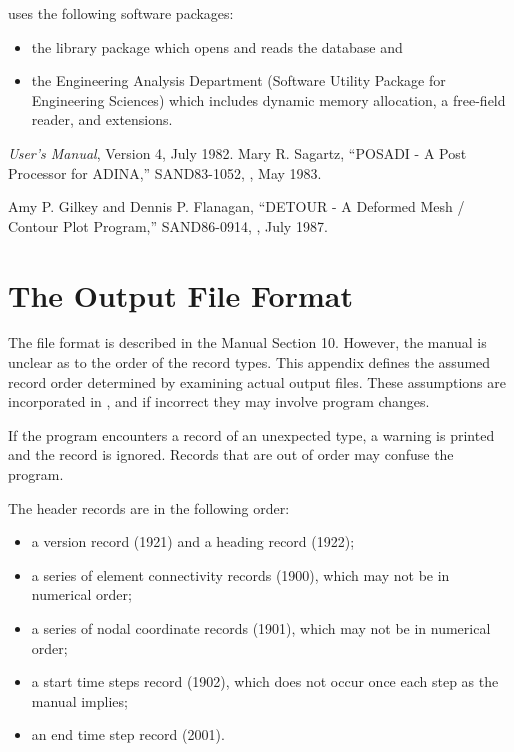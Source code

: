 \caps{\PROGRAM} uses the following software packages:
\setlength{\itemsep}{\medskipamount} \begin{itemize}
\item the  library package which opens and reads the
 database and
\item the Engineering Analysis Department  \cite{bib:supes}
(Software Utility Package for Engineering Sciences) which includes
dynamic memory allocation, a free-field reader, and 
extensions.
\end{itemize}

\setlength{\itemsep}{\bigskipamount} 
\begin{thebibliography}{99}
%
{\em {} User's Manual}, Version 4, July 1982.
%
Mary R. Sagartz, 
``POSADI - A Post Processor for ADINA,''
SAND83-1052, \SNLA, May 1983.
%

%
Amy P. Gilkey and Dennis P. Flanagan, 
``DETOUR - A Deformed Mesh / Contour Plot Program,''
SAND86-0914, \SNLA, July 1987.
%

%

%
\end{thebibliography}

\appendix

\chapter{The  Output File Format} \label{appx:abaqus}

The  file format is described in the  Manual
Section 10. However, the manual is unclear as to the order of the record
types. This appendix defines the assumed record order determined by
examining actual  output files. These assumptions are
incorporated in \caps{\PROGRAM}, and if incorrect they may involve
program changes.

If the program encounters a record of an unexpected type, a warning is
printed and the record is ignored. Records that are out of order may
confuse the program.

The header records are in the following order:
\setlength{\itemsep}{\medskipamount} \begin{itemize}
\item a version record (1921) and a heading record (1922);
\item a series of element connectivity records (1900), which may not be
in numerical order;
\item a series of nodal coordinate records (1901), which may not be in
numerical order;
\item a start time steps record (1902), which does not occur once each
step as the manual implies;
\item an end time step record (2001).
\end{itemize}

